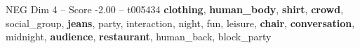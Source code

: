 \begin{textsample}{NEG Dim 4 – Score -2.00 – t005434}  \label{ex:f4_neg_040}
\textbf{clothing}, \textbf{human\_body}, \textbf{shirt}, \textbf{crowd}, social\_group, \textbf{jeans}, party, interaction, night, fun, leisure, \textbf{chair}, \textbf{conversation}, midnight, \textbf{audience}, \textbf{restaurant}, human\_back, block\_party

\end{textsample}

